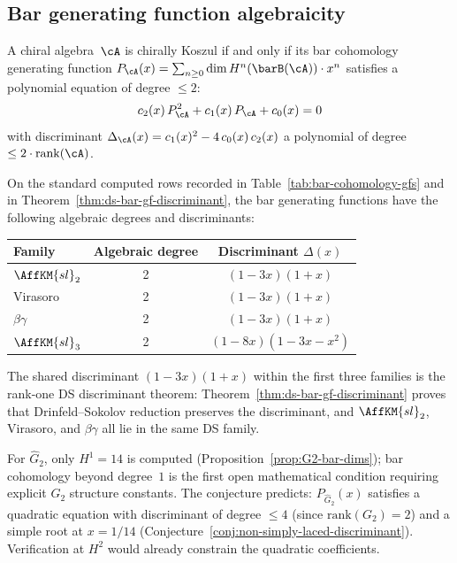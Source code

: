 \subsection{Bar generating function algebraicity}

\begin{conjecture}
\label{conj:bar-gf-algebraicity}
A chiral algebra~$\cA$ is chirally Koszul if and only if its
bar cohomology generating function
$P_\cA(x) = \sum_{n \geq 0} \dim H^n(\barB(\cA)) \cdot x^n$
satisfies a polynomial equation of degree $\leq 2$:
\begin{equation}\label{eq:bar-gf-quadratic}
 c_2(x) \, P_\cA^2 + c_1(x) \, P_\cA + c_0(x) = 0
\end{equation}
with discriminant
$\Delta_\cA(x) = c_1(x)^2 - 4\, c_0(x)\, c_2(x)$
a polynomial of degree $\leq 2 \cdot \mathrm{rank}(\cA)$.
\end{conjecture}

\begin{proposition}
\label{prop:bar-gf-discriminant-witnesses-kps}
On the standard computed rows recorded in
Table~\textup{\ref{tab:bar-cohomology-gfs}} and in
Theorem~\textup{\ref{thm:ds-bar-gf-discriminant}}, the bar
generating functions have the following algebraic degrees and
discriminants:
\begin{center}
\renewcommand{\arraystretch}{1.3}
\begin{tabular}{lcc}
\toprule
Family & Algebraic degree & Discriminant $\Delta(x)$ \\
\midrule
$\AffKM{sl}_2$ & 2 & $(1 - 3x)(1 + x)$ \\
Virasoro & 2 & $(1 - 3x)(1 + x)$ \\
$\beta\gamma$ & 2 & $(1 - 3x)(1 + x)$ \\
$\AffKM{sl}_3$ & 2 & $(1 - 8x)(1 - 3x - x^2)$ \\
\bottomrule
\end{tabular}
\end{center}
The shared discriminant $(1 - 3x)(1 + x)$ within the first three
families is the rank-one DS discriminant theorem:
Theorem~\ref{thm:ds-bar-gf-discriminant} proves that
Drinfeld--Sokolov reduction preserves the discriminant, and
$\AffKM{sl}_2$, Virasoro, and $\beta\gamma$ all lie in the same DS
family.

For $\widehat{G}_2$, only $H^1 = 14$ is computed
(Proposition~\ref{prop:G2-bar-dims}); bar cohomology beyond
degree~$1$ is the first open mathematical condition requiring explicit
$G_2$ structure constants.
The conjecture predicts: $P_{\widehat{G}_2}(x)$ satisfies a
quadratic equation with discriminant of degree $\leq 4$ (since
$\mathrm{rank}(G_2) = 2$) and a simple root at $x = 1/14$
(Conjecture~\ref{conj:non-simply-laced-discriminant}).
Verification at $H^2$ would already constrain the quadratic
coefficients.
\end{proposition}

